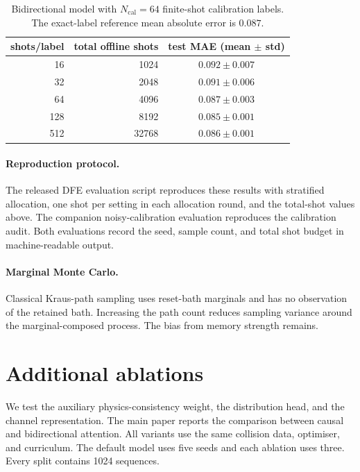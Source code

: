 \documentclass[10pt]{article}
\begin{document}
\begin{table}[h]
\centering
\caption{Bidirectional model with $N_{\mathrm{cal}}=64$ finite-shot calibration labels. The exact-label reference mean absolute error is $0.087$.}
\label{tab:supp_noisy_cal}
\begin{tabular}{rrc}
\toprule
shots/label & total offline shots & test MAE (mean $\pm$ std) \\
\midrule
16 & 1024 & $0.092\pm0.007$ \\
32 & 2048 & $0.091\pm0.006$ \\
64 & 4096 & $0.087\pm0.003$ \\
128 & 8192 & $0.085\pm0.001$ \\
512 & 32768 & $0.086\pm0.001$ \\
\bottomrule
\end{tabular}
\end{table}

\paragraph*{Reproduction protocol.}
The released DFE evaluation script reproduces these results with stratified allocation, one shot per setting in each allocation round, and the total-shot values above. The companion noisy-calibration evaluation reproduces the calibration audit. Both evaluations record the seed, sample count, and total shot budget in machine-readable output.

\paragraph*{Marginal Monte Carlo.}
Classical Kraus-path sampling uses reset-bath marginals and has no observation of the retained bath. Increasing the path count reduces sampling variance around the marginal-composed process. The bias from memory strength remains.


\section{Additional ablations}
\label{supp:ablations}

We test the auxiliary physics-consistency weight, the distribution head, and the channel representation. The main paper reports the comparison between causal and bidirectional attention. All variants use the same collision data, optimiser, and curriculum. The default model uses five seeds and each ablation uses three. Every split contains 1024 sequences.
\end{document}
